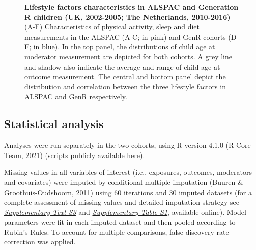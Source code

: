 \documentclass[
  letterpaper,
  DIV=11,
  numbers=noendperiod]{scrreport}
\begin{document}
\begin{figure}[H]


\caption{\label{fig-3.1}\textbf{Lifestyle factors characteristics in
ALSPAC and Generation R children (UK, 2002-2005; The Netherlands,
2010-2016)}\newline(A-F) Characteristics of physical activity, sleep and
diet measurements in the ALSPAC (A-C; in pink) and GenR cohorts (D-F; in
blue). In the top panel, the distributions of child age at moderator
measurement are depicted for both cohorts. A grey line and shadow also
indicate the average and range of child age at outcome measurement. The
central and bottom panel depict the distribution and correlation between
the three lifestyle factors in ALSPAC and GenR respectively.}

\end{figure}%

\subsection{Statistical analysis}\label{statistical-analysis-1}

Analyses were run separately in the two cohorts, using R version 4.1.0
(R Core Team, 2021) (scripts publicly available
\href{https://github.com/SereDef/lifestyle-moderators-project}{here}).

Missing values in all variables of interest (i.e., exposures, outcomes,
moderators and covariates) were imputed by conditional multiple
imputation (Buuren \& Groothuis-Oudshoorn, 2011) using 60 iterations and
30 imputed datasets (for a complete assessment of missing values and
detailed imputation strategy see
\href{https://osf.io/9vky4}{\emph{Supplementary Text S3}} and
\href{https://osf.io/x9g6b}{\emph{Supplementary Table S1}}, available
online). Model parameters were fit in each imputed dataset and then
pooled according to Rubin's Rules. To account for multiple comparisons,
false discovery rate correction was applied.
\end{document}

